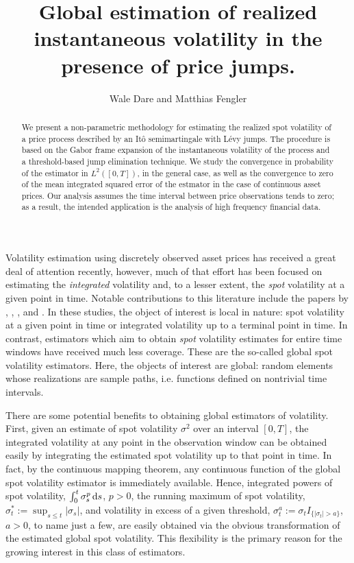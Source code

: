 \documentclass[a4paper, 12pt]{article}
\author{Wale Dare and Matthias Fengler}
\title {Global estimation of realized instantaneous volatility in the presence of \levy price jumps.}
\newcommand{\ito}{It\^o\xspace}
\renewcommand{\D}{\ensuremath{\dif}\xspace}
\newcommand{\levy}{L\'evy\xspace}
\begin{document}
\maketitle
\begin{abstract}
  We present a non-parametric methodology for estimating the realized spot volatility of a price process described by  an \ito semimartingale with \levy jumps. The procedure is based on the Gabor frame expansion of the   instantaneous volatility of the process and  a threshold-based jump elimination technique. We study the convergence in probability of the estimator in $L^2([0,T])$, in the general case,  as well as the convergence to zero of the mean integrated  squared error of the estmator  in the case of continuous asset prices. Our analysis assumes  the time interval between price observations tends to zero; as a result, the intended application is the analysis of high frequency financial data.    

\end{abstract}
Volatility estimation using discretely observed asset prices has received a great deal of attention recently, however,  much of that effort has been focused on 
estimating the \emph{integrated} volatility and, to a lesser extent, the \emph{spot} volatility at a given point in time. 
Notable contributions to this literature include  the papers by \cite{Foster1996}, \cite{Fan2008},   \cite{Florens1993}, and  \cite{BN2004}.
In these studies, the object of interest is local in nature: spot volatility at a given point in time or integrated volatility up to a terminal point in time. In contrast,  estimators which aim  to obtain  \emph{spot} volatility estimates  for  entire time windows  have received much less coverage. These are the so-called global spot volatility estimators. Here,  the objects of interest are global:   random elements whose realizations are sample paths, i.e. functions defined on  nontrivial time intervals.     

There are some potential benefits to obtaining global estimators of volatility. First, given an estimate of spot volatility $\sigma^2$ over an interval $[0,T]$, the  integrated volatility at any point in the observation window can be obtained easily  by integrating the estimated spot volatility up to that point in time.  In fact, by the continuous mapping theorem, any continuous function of the global spot volatility estimator is immediately available. Hence, integrated powers of spot volatility, $\int^t_0\sigma^p_s \D s$, $p > 0$,  the running maximum of spot volatility, $\sigma^*_t := \sup_{s \le t} \vert \sigma_s \vert$, and volatility in  excess of a given threshold, $\sigma^a_t:=  \sigma_t  I_{\{\vert \sigma_t \vert > a\}}$, $a > 0$,  to name just a few, are easily obtained via  the obvious  transformation of the estimated  global spot volatility.   This flexibility is the primary  reason for the growing interest in this class of estimators.
\end{document}
